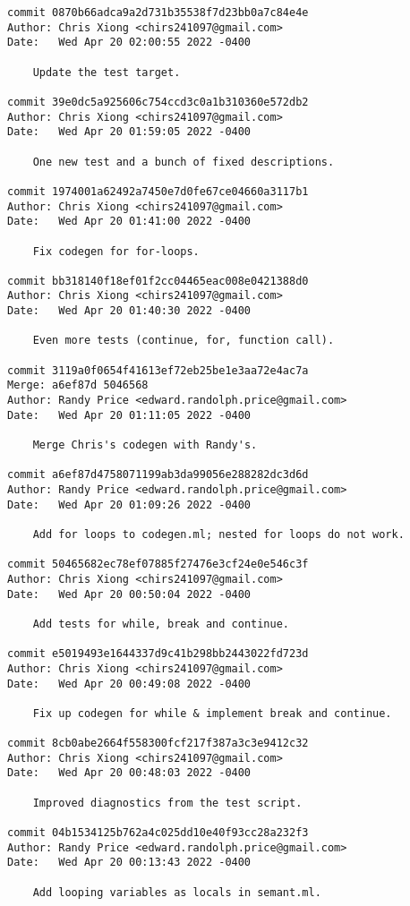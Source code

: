 {\begin{verbatim}
commit 0870b66adca9a2d731b35538f7d23bb0a7c84e4e
Author: Chris Xiong <chirs241097@gmail.com>
Date:   Wed Apr 20 02:00:55 2022 -0400

    Update the test target.

commit 39e0dc5a925606c754ccd3c0a1b310360e572db2
Author: Chris Xiong <chirs241097@gmail.com>
Date:   Wed Apr 20 01:59:05 2022 -0400

    One new test and a bunch of fixed descriptions.

commit 1974001a62492a7450e7d0fe67ce04660a3117b1
Author: Chris Xiong <chirs241097@gmail.com>
Date:   Wed Apr 20 01:41:00 2022 -0400

    Fix codegen for for-loops.

commit bb318140f18ef01f2cc04465eac008e0421388d0
Author: Chris Xiong <chirs241097@gmail.com>
Date:   Wed Apr 20 01:40:30 2022 -0400

    Even more tests (continue, for, function call).

commit 3119a0f0654f41613ef72eb25be1e3aa72e4ac7a
Merge: a6ef87d 5046568
Author: Randy Price <edward.randolph.price@gmail.com>
Date:   Wed Apr 20 01:11:05 2022 -0400

    Merge Chris's codegen with Randy's.

commit a6ef87d4758071199ab3da99056e288282dc3d6d
Author: Randy Price <edward.randolph.price@gmail.com>
Date:   Wed Apr 20 01:09:26 2022 -0400

    Add for loops to codegen.ml; nested for loops do not work.

commit 50465682ec78ef07885f27476e3cf24e0e546c3f
Author: Chris Xiong <chirs241097@gmail.com>
Date:   Wed Apr 20 00:50:04 2022 -0400

    Add tests for while, break and continue.

commit e5019493e1644337d9c41b298bb2443022fd723d
Author: Chris Xiong <chirs241097@gmail.com>
Date:   Wed Apr 20 00:49:08 2022 -0400

    Fix up codegen for while & implement break and continue.

commit 8cb0abe2664f558300fcf217f387a3c3e9412c32
Author: Chris Xiong <chirs241097@gmail.com>
Date:   Wed Apr 20 00:48:03 2022 -0400

    Improved diagnostics from the test script.

commit 04b1534125b762a4c025dd10e40f93cc28a232f3
Author: Randy Price <edward.randolph.price@gmail.com>
Date:   Wed Apr 20 00:13:43 2022 -0400

    Add looping variables as locals in semant.ml.


\end{verbatim}}
